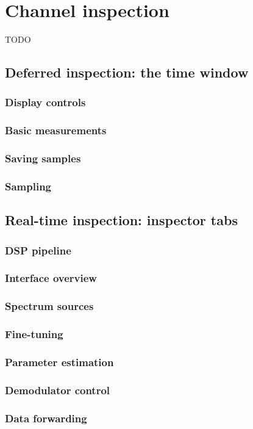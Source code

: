 \documentclass{ol-softwaremanual}
\begin{document}
\chapter{Channel inspection}
TODO
\section{Deferred inspection: the time window}
\subsection{Display controls}
\subsection{Basic measurements}
\subsection{Saving samples}
\subsection{Sampling}

\section{Real-time inspection: inspector tabs}
\subsection{DSP pipeline}
\subsection{Interface overview}
\subsection{Spectrum sources}
\subsection{Fine-tuning}
\subsection{Parameter estimation}
\subsection{Demodulator control}
\subsection{Data forwarding}
\end{document}
